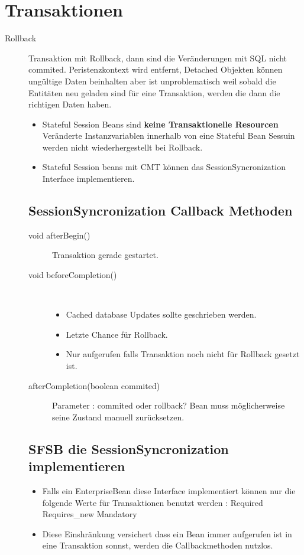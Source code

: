 \documentclass[a4paper,10pt]{scrreprt}
\begin{document}
\chapter{Transaktionen}
\begin{description}
 \item [Rollback] Transaktion mit Rollback, dann sind die Veränderungen mit SQL nicht commited. Peristenzkontext wird 
entfernt, Detached Objekten können ungültige Daten beinhalten aber ist unproblematisch weil sobald die Entitäten neu 
geladen sind für eine Transaktion, werden die dann die richtigen Daten haben.
\begin{itemize}
 \item Stateful Session Beans sind \textbf{keine Transaktionelle Resourcen} Veränderte Instanzvariablen innerhalb von 
eine Stateful Bean Sessuin werden nicht wiederhergestellt bei Rollback.
\item Stateful Session beans mit CMT können das SessionSyncronization Interface implementieren.
\end{itemize}

\section{SessionSyncronization Callback Methoden}
\begin{description}
 \item [void afterBegin()] Transaktion gerade gestartet.
 \item [void beforeCompletion()] \hfill \\
 \begin{itemize}
  \item Cached database Updates sollte geschrieben werden.
  \item Letzte Chance für Rollback.
  \item Nur aufgerufen falls Transaktion noch nicht für Rollback gesetzt ist.
  
 \end{itemize}
\item [afterCompletion(boolean commited)] Parameter : commited oder rollback? Bean muss möglicherweise seine Zustand 
manuell zurücksetzen.
\end{description}

\section{SFSB die SessionSyncronization implementieren}
\begin{itemize}
 \item Falls ein EnterpriseBean diese Interface implementiert können nur die folgende Werte für Transaktionen benutzt 
werden : 
 \subitem Required
 \subitem Requires\_new
 \subitem Mandatory
 \item Diese Einshränkung versichert dass ein Bean immer aufgerufen ist in eine Transaktion sonnst, werden die 
Callbackmethoden nutzlos.
\end{itemize}

\end{description}
\end{document}
